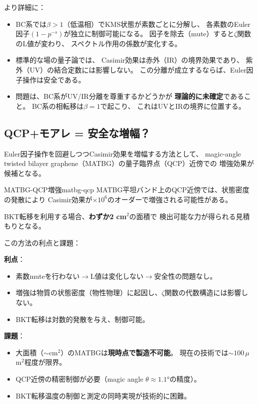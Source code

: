 \noindent
より詳細に：
\begin{itemize}
\item BC系では$\beta > 1$（低温相）でKMS状態が素数ごとに分解し、
各素数のEuler因子$(1 - p^{-s})$が独立に制御可能になる。
因子を除去（mute）すると$\zeta$関数のL値が変わり、
スペクトル作用の係数が変化する。

\item 標準的な場の量子論では、
Casimir効果は赤外（IR）の境界効果であり、
紫外（UV）の結合定数には影響しない。
この分離が成立するならば、Euler因子操作は安全である。

\item 問題は、BC系がUV/IR分離を尊重するかどうかが
\textbf{理論的に未確定}であること。
BC系の相転移は$\beta = 1$で起こり、
これはUVとIRの境界に位置する。
\end{itemize}


\subsection{QCP+モアレ = 安全な増幅？}
\label{sec:14.4}

Euler因子操作を回避しつつCasimir効果を増幅する方法として、
magic-angle twisted bilayer graphene（MATBG）の量子臨界点（QCP）近傍での
増強効果が候補となる。

\begin{keyresult}{MATBG-QCP増強}{matbg-qcp}
MATBG平坦バンド上のQCP近傍では、状態密度の発散により
Casimir効果が$\times 10^6$のオーダーで増強される可能性がある。

BKT転移を利用する場合、\textbf{わずか2 cm$^2$}の面積で
検出可能な力が得られる見積もりとなる。
\end{keyresult}

\noindent
この方法の利点と課題：

\textbf{利点}：
\begin{itemize}
\item 素数muteを行わない$\to$L値は変化しない$\to$安全性の問題なし。
\item 増強は物質の状態密度（物性物理）に起因し、$\zeta$関数の代数構造には影響しない。
\item BKT転移は対数的発散を与え、制御可能。
\end{itemize}

\textbf{課題}：
\begin{itemize}
\item 大面積（$\sim$cm$^2$）のMATBGは\textbf{現時点で製造不可能}。
  現在の技術では$\sim 100\,\mu$m$^2$程度が限界。
\item QCP近傍の精密制御が必要（magic angle $\theta \approx 1.1°$の精度）。
\item BKT転移温度の制御と測定の同時実現が技術的に困難。
\end{itemize}


